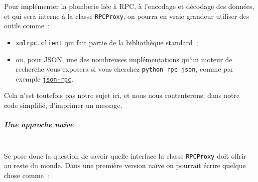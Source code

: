     Pour implémenter la plomberie liée à RPC, à l'encodage et décodage des
données, et qui sera interne à la classe \texttt{RPCProxy}, on pourra en
vraie grandeur utiliser des outils comme~:

\begin{itemize}
\tightlist
\item
  \href{https://docs.python.org/3/library/xmlrpc.client.html}{\texttt{xmlrpc.client}}
  qui fait partie de la bibliothèque standard~;
\item
  ou, pour JSON, une des nombreuses implémentations qu'un moteur de
  recherche vous exposera si vous cherchez \texttt{python\ rpc\ json},
  comme par exemple
  \href{https://pypi.python.org/pypi/json-rpc/}{\texttt{json-rpc}}.
\end{itemize}

Cela n'est toutefois pas notre sujet ici, et nous nous contenterons,
dans notre code simplifié, d'imprimer un message.

    \hypertarget{une-approche-nauxefve}{%
\subparagraph{Une approche naïve\\\\}\label{une-approche-nauxefve}}

    Se pose donc la question de savoir quelle interface la classe
\texttt{RPCProxy} doit offrir au reste du monde. Dans une première
version naïve on pourrait écrire quelque chose comme~:

